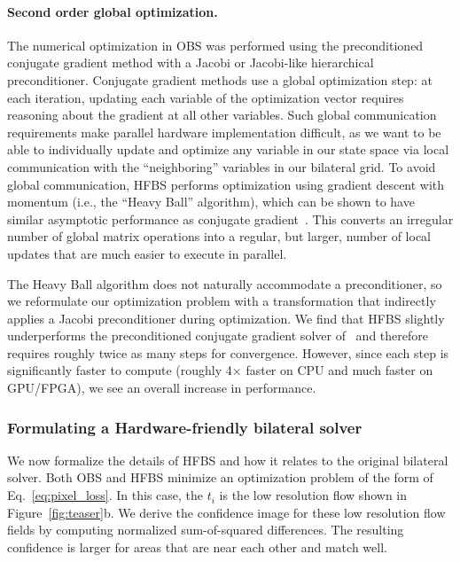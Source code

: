 \paragraph{Second order global optimization.}
The numerical optimization in OBS was performed using the preconditioned conjugate gradient method with a Jacobi or Jacobi-like hierarchical preconditioner.
Conjugate gradient methods use a global optimization step: at each iteration, updating each variable of the optimization vector requires reasoning about the gradient at all other variables.
Such global communication requirements make parallel hardware implementation difficult, as we want to be able to individually update and optimize any variable in our state space via local communication with the ``neighboring'' variables in our bilateral grid.
To avoid global communication, HFBS performs optimization using gradient descent with momentum (i.e., the ``Heavy Ball'' algorithm), which can be shown to have similar asymptotic performance as conjugate gradient~\cite{polyak1964some}.
This converts an irregular number of global matrix operations into a regular, but larger, number of local updates that are much easier to execute in parallel.

The Heavy Ball algorithm does not naturally accommodate a preconditioner, so we reformulate our optimization problem with a transformation that indirectly applies a Jacobi preconditioner during optimization.
We find that HFBS slightly underperforms the preconditioned conjugate gradient solver of~\cite{BarronPoole2016} and therefore requires roughly twice as many steps for convergence.
However, since each step is significantly faster to compute (roughly 4$\times$ faster on CPU and much faster on GPU/FPGA), we see an overall increase in performance.

\subsubsection{Formulating a Hardware-friendly bilateral solver}
We now formalize the details of HFBS and how it relates to the original bilateral solver. Both OBS and HFBS minimize an optimization problem of the form of Eq.~\ref{eq:pixel_loss}. In this case, the $t_i$ is the low resolution flow shown in Figure~\ref{fig:teaser}b. We derive the confidence image for these low resolution flow fields by computing normalized sum-of-squared differences.
The resulting confidence is larger for areas that are near each other and match well.

